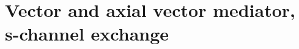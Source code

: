 \newcommand{\bra}[1]{\langle #1|}
\newcommand{\ket}[1]{|#1\rangle}
\newcommand{\MET}{\slashed{E}_T}
\newcommand{\mDM}{m_{\rm{DM}}}
\newcommand{\mMed}{M_{\rm{med}}}
\newcommand{\gDM}{g_{\rm{DM}}}
\newcommand{\gq}{g_q}
\newcommand{\ifb}{\rm{fb}^{-1}}

\section{Vector and axial vector mediator, s-channel exchange}
\label{sec:monojet_V}



